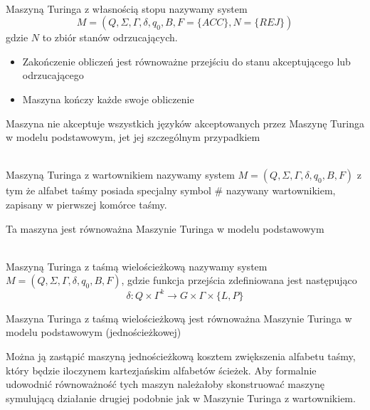 \begin{df}~\\
	Maszyną Turinga z własnością stopu nazywamy system 
	\begin{equation}
		M = (Q, \Sigma, \Gamma, \delta, q_0, B, F = \{ACC\}, N = \{REJ\})
	\end{equation}
	gdzie $N$ to zbiór stanów odrzucających.
	\begin{itemize}
		\item Zakończenie obliczeń jest równoważne przejściu do stanu akceptującego lub odrzucającego
		\item Maszyna kończy każde swoje obliczenie
	\end{itemize}
	\begin{uwaga}
		Maszyna nie akceptuje wszystkich języków akceptowanych przez Maszynę Turinga w modelu 
		podstawowym, jet jej szczególnym przypadkiem
	\end{uwaga}
\end{df}

\begin{df}~\\
	Maszyną Turinga z wartownikiem nazywamy system $M = (Q, \Sigma, \Gamma, \delta, q_0, B, F)$
	z tym że alfabet taśmy posiada specjalny symbol $\#$ nazywany wartownikiem, zapisany w pierwszej 
	komórce taśmy.
	\begin{uwaga}
		Ta maszyna jest równoważna Maszynie Turinga w modelu podstawowym
	\end{uwaga}
\end{df}

\begin{df}~\\
	Maszyną Turinga z taśmą wielościeżkową nazywamy system $M = (Q, \Sigma, \Gamma, \delta, q_0, B, F)$,
	gdzie funkcja przejścia zdefiniowana jest następująco
	\begin{equation}
		\delta : Q\times\Gamma^k\rightarrow G\times\Gamma\times\{L,P\}
	\end{equation}
\end{df}

\begin{tw}
	Maszyna Turinga z taśmą wielościeżkową jest równoważna Maszynie Turinga w modelu podstawowym (jednościeżkowej)
\begin{uwaga}
	Można ją zastąpić maszyną jednościeżkową kosztem zwiększenia alfabetu taśmy, który będzie
	iloczynem kartezjańskim alfabetów ścieżek.
	Aby formalnie udowodnić równoważność tych maszyn należałoby skonstruować maszynę symulującą
	działanie drugiej podobnie jak w Maszynie Turinga z wartownikiem.
\end{uwaga}
\end{tw}

